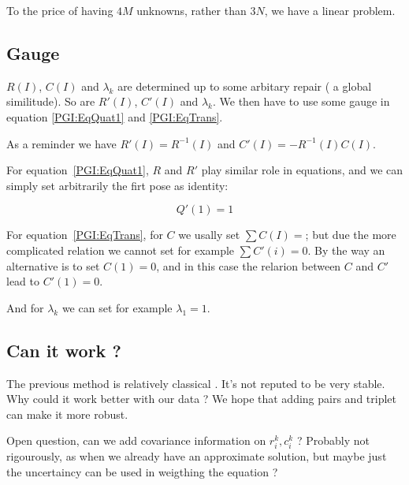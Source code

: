 To the price of having $4M$ unknowns, rather than $3N$, we have a linear problem.


\subsection{Gauge}

$R(I)$, $C(I)$ and $\lambda_k$ are determined up to some arbitary repair (
a global similitude). So are $R'(I)$, $C'(I)$ and $\lambda_k$.
We then have to use some gauge in equation \ref{PGI:EqQuat1} and \ref{PGI:EqTrans}.

As a reminder we have $R'(I) = R^{-1}(I)$ and $C'(I) = - R^{-1}(I) C(I) $.

For equation~\ref{PGI:EqQuat1}, $R$ and $R'$ play similar role  in equations,
and we can simply set arbitrarily the firt pose as identity:

\begin{equation}
       Q'(1) = 1
   \label{PGI:GaugeQuat}
\end{equation}

For equation~\ref{PGI:EqTrans},  for $C$ we usally set $ \sum C(I)=$;
but due the more complicated relation we cannot set for example 
$\sum C'(i)=0 $.  By the way an alternative is to set $C(1)=0$,
and in this case the relarion between $C$ and $C'$ lead to $C'(1)=0$.

And for $\lambda_k$ we can set for example $\lambda_1=1$.




\subsection{Can it work ?}

The previous method is relatively classical . It's not reputed to  be very stable.
Why could it work better with our data ?  We hope that adding pairs and triplet
can make it more robust.

Open question, can we add covariance information on $ r^k_i , c^k_i $ ?  Probably not rigourously,
as when we already have an approximate solution, but maybe just the uncertaincy can be used in weigthing the equation ?




